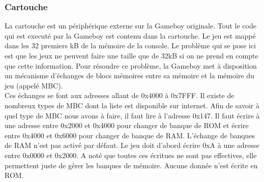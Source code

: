 \documentclass[a4paper]{article}
\begin{document}
\subsubsection{Cartouche}

La cartouche est un périphérique externe sur la Gameboy originale. Tout le code
qui est executé par la Gameboy est contenu dans la cartouche. Le jeu est mappé 
dans les 32 premiers kB de la mémoire de la console. Le problème qui se pose ici
est que les jeux ne peuvent faire une taille que de 32kB si on ne prend en compte
que cette information. Pour résoudre ce problème, la Gameboy met à disposition 
un mécanisme d'échanges de blocs mémoires entre sa mémoire et la mémoire du jeu 
(appelé MBC). \\

Ces échanges se font aux adresses allant de 0x4000 à 0x7FFF. Il existe de nombreux 
types de MBC dont la liste est disponible sur internet. Afin de savoir à quel type 
de MBC nous avons à faire, il faut lire à l'adresse 0x147. Il faut écrire à une 
adresse entre 0x2000 et 0x4000 pour changer de banque de ROM et écrire entre 0x4000 
et 0x6000 pour changer de banque de RAM. L'échange de banques de RAM n'est pas activé 
par défaut. Le jeu doit d'abord écrire 0xA à une adresse entre 0x0000 et 0x2000. 
A noté que toutes ces écritues ne sont pas effectives, elle permettent juste de 
gérer les banques de mémoire. Aucune donnée n'est écrite en ROM.

\newpage
\end{document}
